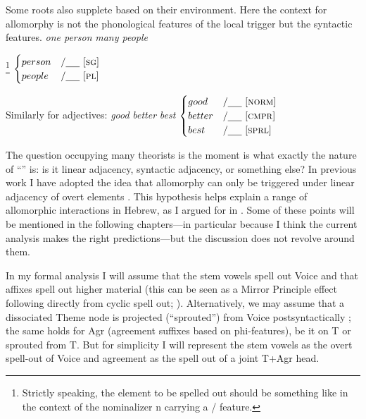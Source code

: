 Some roots also supplete based on their environment. Here the context for allomorphy is not the phonological features of the local trigger but the syntactic features.
\pex
	\a \emph{one person}		
	\a \emph{many people}
\xe

\ex  {}\footnote{Strictly speaking, the element to be spelled out should be something like  in the context of the nominalizer n carrying a / feature.} \lra $\begin{cases}
	person & / \trace~ \text{[\gsc{SG}]} \\
	people & / \trace ~ \text{[\gsc{PL}]} \\
	\end{cases}$
\xe

Similarly for adjectives:
\pex
	\a \emph{good}		
	\a \emph{better}
	\a \emph{best}
\xe
\ex {} \lra $\begin{cases}
	good & / \trace~ \text{[\gsc{NORM}]} \\
	better & / \trace ~ \text{[\gsc{CMPR}]} \\
	best & / \trace ~ \text{[\gsc{SPRL}]} \\
	\end{cases}$
\xe

The question occupying many theorists is the moment is what exactly the nature of ``\trace'' is: is it linear adjacency, syntactic adjacency, or something else? In previous work I have adopted the idea that allomorphy can only be triggered under linear adjacency of overt elements \citep{embick10,marantz13}. This hypothesis helps explain a range of allomorphic interactions in Hebrew, as I argued for in \cite{kastner18nllt}. Some of these points will be mentioned in the following chapters---in particular because I think the current analysis makes the right predictions---but the discussion does not revolve around them.

In my formal analysis I will assume that the stem vowels spell out Voice and that affixes spell out higher material (this can be seen as a Mirror Principle effect following directly from cyclic spell out; \citealt{baker85,muysken88,katie13,zukoff16nels,kastner18nllt}). Alternatively, we may assume that a dissociated Theme node is projected (``sprouted'') from Voice postsyntactically \citep{oltramassuet99,embick10}; the same holds for Agr (agreement suffixes based on phi-features), be it on T or sprouted from T. But for simplicity I will represent the stem vowels as the overt spell-out of Voice and agreement as the spell out of a joint T+Agr head.

